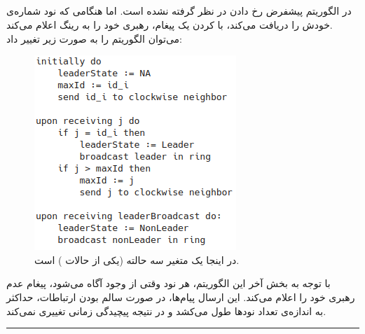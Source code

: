 \documentclass{article}
\begin{document}
\begin{multicols}{2}
\subsection{}
در الگوریتم پیشفرض
رخ دادن 
در نظر گرفته نشده است. اما هنگامی که نود 
شماره‌ی خودش را دریافت می‌کند، با
کردن یک پیغام، رهبری خود را به رینگ اعلام می‌کند.\\
می‌توان الگوریتم را به صورت زیر تغییر داد:
\begin{figure}[H]
    \centering
    \includegraphics[width=0.95\linewidth]{Photos/HW3/lcr.png}
    \caption{
    در اینجا
    یک متغیر سه حالته (یکی از حالات
    ) است.
    }
    \label{fig:my_label}
\end{figure}
با توجه به بخش آخر این الگوریتم، هر نود وقتی از وجود
آگاه می‌شود، پیغام عدم رهبری خود را اعلام می‌کند. این ارسال پیام‌ها، در صورت سالم بودن ارتباطات، حداکثر به اندازه‌ی تعداد نودها طول می‌کشد و در نتیجه پیچیدگی زمانی تغییری نمی‌کند.\\
\rule{\linewidth}{1pt}


\end{multicols}
\end{document}
